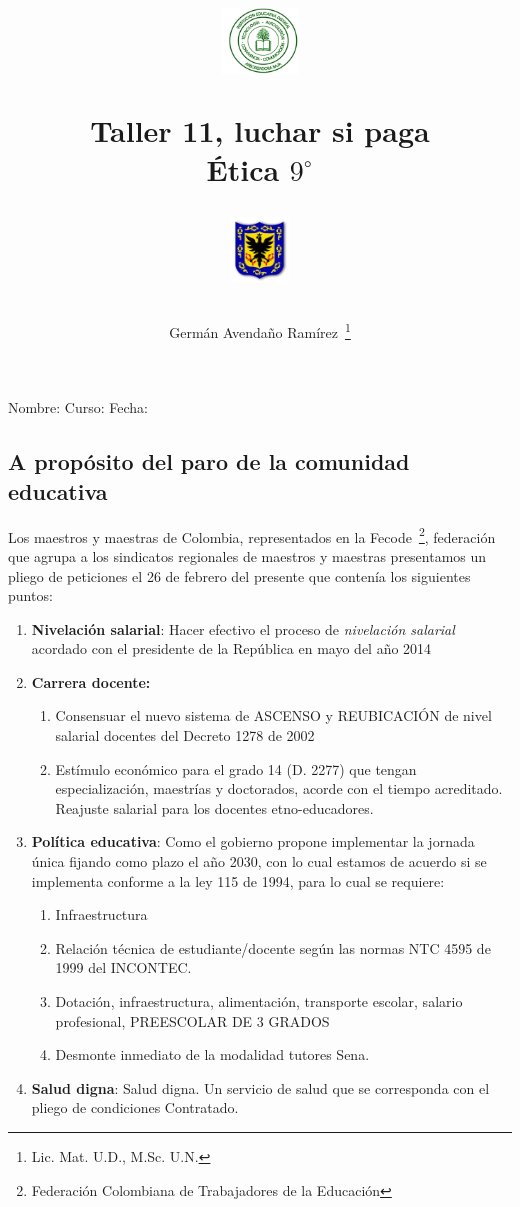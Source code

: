 \documentclass[letterpaper,11pt,twoside]{article}
\author{Germ\'an Avenda\~no Ram\'irez~\thanks{Lic. Mat. U.D., M.Sc. U.N.}}
\title{\begin{minipage}{.2\textwidth}
\includegraphics[height=1.75cm]{Images/logo-colegio.png}\end{minipage}
\begin{minipage}{.55\textwidth}
\begin{center}
Taller 11, luchar si paga\\
Ética $9^{\circ}$
\end{center}
\end{minipage}\hfill
\begin{minipage}{.2\textwidth}
\includegraphics[height=1.75cm]{Images/logo-sed.png} 
\end{minipage}}
\date{}
\begin{document}
\maketitle
Nombre: \hrulefill Curso: \underline{\hspace*{44pt}} Fecha: \underline{\hspace*{2.5cm}}
\begin{multicols}{2}
 \section*{A propósito del paro de la comunidad educativa}
 Los maestros y maestras de Colombia, representados en la Fecode~\footnote{Federación Colombiana de Trabajadores de la Educación}, federación que agrupa a los sindicatos regionales de maestros y maestras presentamos un pliego de peticiones el 26 de febrero del presente que contenía los siguientes puntos:
 \begin{enumerate}
 \item \textbf{Nivelación salarial}: Hacer efectivo el proceso de \emph{nivelación salarial} acordado con el presidente de la República en mayo del año 2014
 \item \textbf{Carrera docente:} 
 \begin{enumerate}
 \item  Consensuar el nuevo sistema de ASCENSO y REUBICACIÓN de nivel salarial docentes del Decreto 1278 de 2002
 \item Estímulo económico para el grado 14 (D. 2277) que tengan especialización, maestrías y doctorados, acorde con el tiempo acreditado. Reajuste salarial para los docentes etno-educadores.
\end{enumerate}  
 \item \textbf{Política educativa}: Como el gobierno propone implementar la jornada única fijando como plazo el año 2030, con lo cual estamos de acuerdo si se implementa conforme a la ley 115 de 1994, para lo cual se requiere:
 \begin{enumerate}
 \item Infraestructura
 \item Relación técnica de estudiante/docente según las normas NTC 4595 de 1999 del INCONTEC.
\item Dotación, infraestructura, alimentación, transporte escolar, salario profesional, PREESCOLAR DE 3 GRADOS
\item Desmonte inmediato de la modalidad tutores Sena.
 \end{enumerate}
 \item \textbf{Salud digna}: Salud digna. Un servicio de salud que se corresponda con el pliego de condiciones Contratado.\\

\end{enumerate}
\end{multicols}
\end{document}
